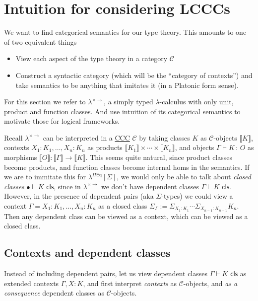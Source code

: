\message{ !name(LF+Equality_LCCC.tex)}\documentclass{article}
\newcommand{\STLC}{\la^{\times \to}}
\newcommand{\LF}[1]{\la^{\Pi \mathsf{Eq}}[#1]}
\newcommand{\tdt}{\times \cdots \times}
\newcommand{\bbrkt}[1]{\llbracket #1 \rrbracket}
\newcommand{\CtxExt}[3]{#1,#2 : #3}
\newcommand{\ClsJdg}[2]{#1 \vdash #2 \,\, \mathsf{cls}}
\newcommand{\ObjJdg}[3]{#1 \vdash #2 \, : \, #3 }
\newcommand{\<}{\langle}
\renewcommand{\>}{\rangle}
\newcommand{\la}{\lambda}
\newcommand{\Ga}{\Gamma}
\newcommand{\Si}{\Sigma}
\newcommand{\CC}{\mathcal{C}}
\newcommand{\linkto}[2]{\hyperlink{#1}{#2}}
\theoremstyle{definitionstyle}
\theoremstyle{exercisestyle}
\theoremstyle{remarkstyle}
\begin{document}
\section{Intuition for considering LCCCs}

We want to find categorical semantics for our type theory.
This amounts to one of two equivalent things
\begin{itemize}
  \item View each aspect of the type theory in a category $\CC$
  \item Construct a syntactic category (which will be the ``category of contexts'')
        and take semantics to be anything that imitates it (in a Platonic form sense).
\end{itemize}

For this section we refer to $\STLC$,
a simply typed $\la$-calculus with only unit, product and function classes.
And use intuition of its categorical semantics to motivate those for logical frameworks.

Recall $\STLC$ can be interpreted in a \linkto{dfn_CCC}{CCC} $\CC$ by
taking classes $K$ as $\CC$-objects $\bbrkt{K}$,
contexts $\CtxExt{X_{1}:K_{1},\dots}{X_{n}}{K_{n}}$
as products $\bbrkt{K_{1}} \tdt \bbrkt{K_{n}}$,
and objects $\ObjJdg{\Ga}{K}{O}$ as morphisms $\bbrkt{O} : \bbrkt{\Ga} \to \bbrkt{K}$. %
This seems quite natural, since product classes become products,
and function classes become internal homs in the semantics.
If we are to immitate this for $\LF{\Si}$,
we would only be able to talk about \textit{closed classes} $\ClsJdg{\bullet}{K}$,
since in $\STLC$ we don't have dependent classes $\ClsJdg{\Ga}{K}$.
However, in the presence of dependent pairs (aka $\Si$-types) we
could view a context $\Ga = \CtxExt{X_{1}:K_{1},\dots}{X_{n}}{K_{n}}$
as a closed class $\Si_{\Ga} := \Si_{X_{1}:K_{1}} \cdots \Si_{X_{n-1}:K_{n-1}} K_{n}$.
Then any dependent class can be viewed as a context, which can be viewed as a closed class.

\subsection{Contexts and dependent classes}

Instead of including dependent pairs,
let us view dependent classes $\ClsJdg{\Ga}{K}$ as extended contexts
$\CtxExt{\Ga}{X}{K}$, and first interpret \textit{contexts} as $\CC$-objects,
and \textit{as a consequence} dependent classes as $\CC$-objects.
\end{document}
